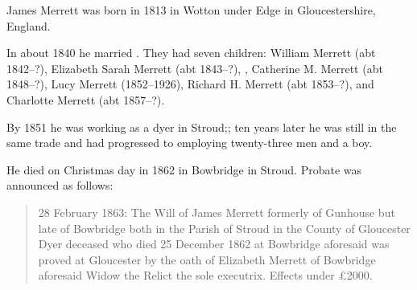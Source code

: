 
James Merrett\cite{HH-MMM-marriage} was born in 1813 in Wotton under Edge in Gloucestershire, England.

In about 1840 he married .\cite{PeterKarpinski_2016-04-04}
They had seven children: William Merrett (abt 1842--?), Elizabeth Sarah Merrett (abt 1843--?), , Catherine M. Merrett (abt 1848--?), Lucy Merrett (1852--1926), Richard H. Merrett (abt 1853--?), and Charlotte Merrett (abt 1857--?). 

By 1851 he was working as a dyer in Stroud;\cite{Census1851Merrett}; ten years later he was still in the same trade and had progressed to employing twenty-three men and a boy.\cite{Census1861Merrett}

He died on Christmas day in 1862 in Bowbridge in Stroud. Probate was announced as follows:\cite{JamesMerrettProbate}

\begin{quotation}
28 February 1863: The Will of James Merrett formerly of Gunhouse but late of Bowbridge both in the Parish of Stroud in the County of Gloucester Dyer deceased who died 25 December 1862 at Bowbridge aforesaid was proved at Gloucester by the oath of Elizabeth Merrett of Bowbridge aforesaid Widow the Relict the sole executrix. Effects under \pounds2000.
\end{quotation}
